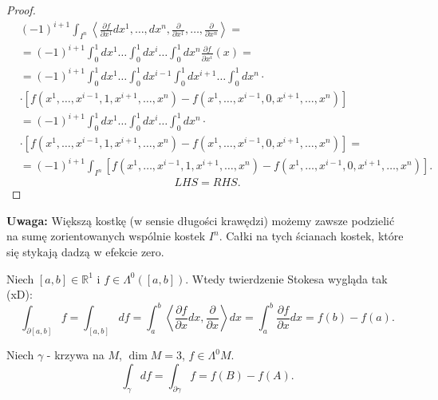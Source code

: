 \documentclass[../main.tex]{subfiles}
\begin{document}
\begin{proof}
\begin{align*}
    &(-1)^{i+1} \int_{I^n}\left< \frac{\partial f}{\partial x^1} dx^1,\ldots,dx^n, \frac{\partial }{\partial x^1} , \ldots, \frac{\partial }{\partial x^n}  \right> = \\
    &= (-1)^{i+1} \int_0^1dx^1\ldots\int_0^1 dx^i\ldots\int_0^1dx^n \frac{\partial f}{\partial x^i} (x) =\\
    &= (-1)^{i+1} \int_0^1dx^1\ldots\int_0^1dx^{i-1}\int_0^1dx^{i+1}\ldots\int_0^1dx^n\cdot  \\
    &\cdot \left[ f(x^1,\ldots,x^{i-1},1,x^{i+1},\ldots,x^n) - f(x^1,\ldots,x^{i-1}, 0, x^{i+1}, \ldots, x^n) \right]  \\
    &= (-1)^{i+1}\int_0^1dx^1\ldots\int_0^1dx^i\ldots\int_0^1dx^n\cdot \\
    &\cdot \left[ f(x^1,\ldots,x^{i-1},1,x^{i+1},\ldots,x^n) - f(x^1,\ldots,x^{i-1}, 0, x^{i+1}, \ldots, x^n) \right] = \\
    &= (-1)^{i+1} \int_{I^n}\left[ f(x^1,\ldots,x^{i-1},1,x^{i+1},\ldots,x^n) - f(x^1,\ldots,x^{i-1},0,x^{i+1},\ldots,x^n) \right]
.\end{align*}
\[
LHS = RHS
.\]
\end{proof}
\textbf{Uwaga:} Większą kostkę (w sensie długości krawędzi) możemy zawsze podzielić na sumę zorientowanych wspólnie kostek $I^n$. Całki na tych ścianach kostek, które się stykają dadzą w efekcie zero.
\begin{przyklad}
    Niech $[a,b]\in \mathbb{R}^1$ i $f\in \Lambda^0\left( [a,b] \right) $. Wtedy twierdzenie Stokesa wygląda tak (xD):
    \[
        \int_{\partial[a,b]} f= \int_{[a,b]} df = \int_a^b \left<\frac{\partial f}{\partial x}dx , \frac{\partial }{\partial x}  \right>dx = \int_a^b \frac{\partial f}{\partial x} dx = f(b) - f(a)
    .\]
\end{przyklad}
\begin{przyklad}
    Niech $\gamma$ - krzywa na $M$, $\dim M = 3$, $f \in \Lambda^0M$.
     \[
         \int_\gamma df= \int_{\partial \gamma} f = f(B) - f(A)
    .\]
\end{przyklad}
\end{document}
